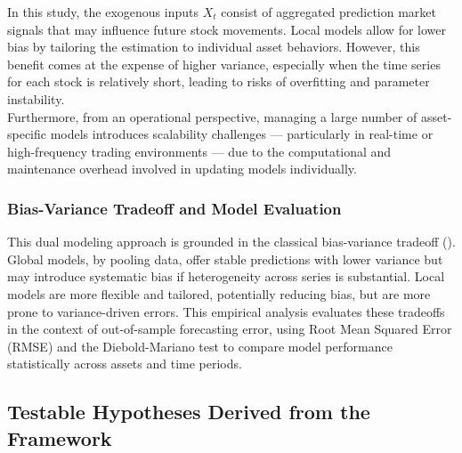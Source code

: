 \documentclass[12pt]{report}
\begin{document}
In this study, the exogenous inputs \( X_t \) consist of aggregated prediction market signals that may influence future stock movements. Local models allow for lower bias by tailoring the estimation to individual asset behaviors. However, this benefit comes at the expense of higher variance, especially when the time series for each stock is relatively short, leading to risks of overfitting and parameter instability.\\

Furthermore, from an operational perspective, managing a large number of asset-specific models introduces scalability challenges — particularly in real-time or high-frequency trading environments — due to the computational and maintenance overhead involved in updating models individually.

\subsubsection{Bias-Variance Tradeoff and Model Evaluation}

This dual modeling approach is grounded in the classical bias-variance tradeoff (\cite{geman_bias_1992}). Global models, by pooling data, offer stable predictions with lower variance but may introduce systematic bias if heterogeneity across series is substantial. Local models are more flexible and tailored, potentially reducing bias, but are more prone to variance-driven errors. This empirical analysis evaluates these tradeoffs in the context of out-of-sample forecasting error, using Root Mean Squared Error (RMSE) and the Diebold-Mariano test to compare model performance statistically across assets and time periods.


\subsection{Testable Hypotheses Derived from the Framework}
\end{document}
